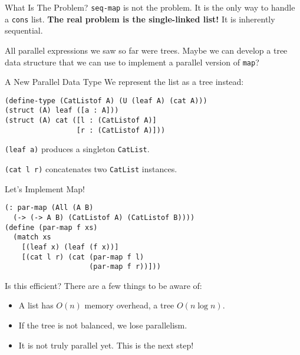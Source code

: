 \documentclass{beamer}
\begin{document}
\begin{frame}{What Is The Problem?}
  \lstinline{seq-map} is not the problem. It is the only way to handle a \lstinline{cons} list. \textbf{The real problem is the single-linked list!} It is inherently sequential.

\pause{} \vspace{1cm}

All parallel expressions we saw so far were trees. Maybe we can develop a tree data structure that we can use to implement a parallel version of \lstinline{map}?
\end{frame}

\begin{frame}[fragile]{A New Parallel Data Type}
We represent the list as a tree instead:
\begin{lstlisting}
(define-type (CatListof A) (U (leaf A) (cat A)))
(struct (A) leaf ([a : A]))
(struct (A) cat ([l : (CatListof A)]
                 [r : (CatListof A)]))
\end{lstlisting}

\pause{} \vspace{.5cm}

\lstinline{(leaf a)} produces a singleton \lstinline{CatList}.

\lstinline{(cat l r)} concatenates two \lstinline{CatList} instances.
\end{frame}

\begin{frame}[fragile]{Let's Implement Map!}
\begin{lstlisting}
(: par-map (All (A B)
  (-> (-> A B) (CatListof A) (CatListof B))))
(define (par-map f xs)
  (match xs
    [(leaf x) (leaf (f x))]
    [(cat l r) (cat (par-map f l)
                    (par-map f r))]))
\end{lstlisting}

\pause{} \vspace{.5cm}

Is this efficient? There are a few things to be aware of:

\begin{itemize}
\item A list has $O(n)$ memory overhead, a tree $O(n \log n)$.
\item If the tree is not balanced, we lose parallelism.
\item It is not truly parallel yet. This is the next step!
\end{itemize}
\end{frame}
\end{document}

